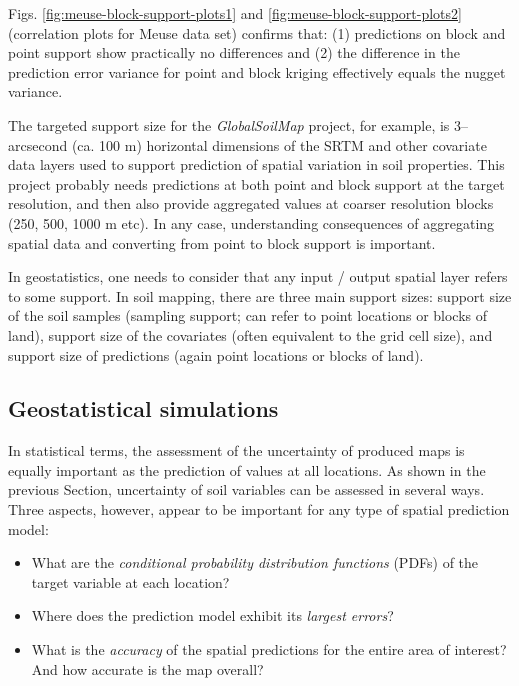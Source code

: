 \documentclass[graybox,natbib,nospthms,UStrade]{svmono}
\let\BeginKnitrBlock\begin \let\EndKnitrBlock\end
\let\BeginKnitrBlock\begin \let\EndKnitrBlock\end
\begin{document}
Figs. \ref{fig:meuse-block-support-plots1} and \ref{fig:meuse-block-support-plots2}
(correlation plots for Meuse data set) confirms that:
(1) predictions on block and point support show
practically no differences and (2) the difference in the prediction
error variance for point and block kriging effectively equals the nugget
variance.

The targeted support size for the \emph{GlobalSoilMap} project, for example,
is 3--arcsecond (ca. 100 m) horizontal dimensions of the SRTM and other
covariate data layers used to support prediction of spatial variation in
soil properties. This project probably needs predictions at both point and
block support at the target resolution, and then also provide aggregated
values at coarser resolution blocks (250, 500, 1000 m etc). In any case,
understanding consequences of aggregating spatial data and converting
from point to block support is important.

\BeginKnitrBlock{rmdnote}
In geostatistics, one needs to consider that any input / output spatial
layer refers to some support. In soil mapping, there are three main
support sizes: support size of the soil samples (sampling support; can
refer to point locations or blocks of land), support size of the
covariates (often equivalent to the grid cell size), and support size of
predictions (again point locations or blocks of land).
\EndKnitrBlock{rmdnote}

\hypertarget{gstat-sims}{%
\subsection{Geostatistical simulations}\label{gstat-sims}}

In statistical terms, the assessment of the uncertainty of produced maps
is equally important as the prediction of values at all locations. As
shown in the previous Section, uncertainty of soil variables can be
assessed in several ways. Three aspects, however, appear to be important
for any type of spatial prediction model:

\begin{itemize}
\item
  What are the \emph{conditional probability distribution functions} (PDFs)
  of the target variable at each location?
\item
  Where does the prediction model exhibit its \emph{largest errors}?
\item
  What is the \emph{accuracy} of the spatial predictions for the entire area
  of interest? And how accurate is the map overall?
\end{itemize}
\end{document}
